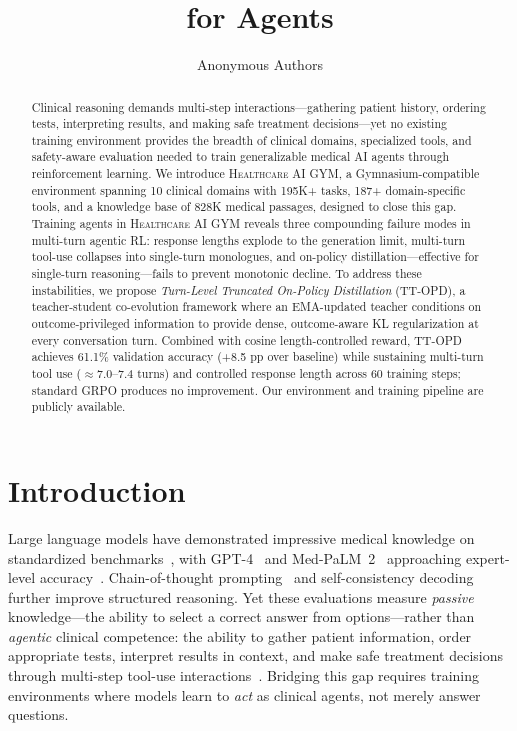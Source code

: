 \documentclass{article}
\title{\gym{} for Agents}
\author{%
  Anonymous Authors \\
}
\newcommand{\gym}{\textsc{Healthcare AI GYM}}
\begin{document}
\maketitle

\begin{abstract}
Clinical reasoning demands multi-step interactions---gathering patient history, ordering tests, interpreting results, and making safe treatment decisions---yet no existing training environment provides the breadth of clinical domains, specialized tools, and safety-aware evaluation needed to train generalizable medical AI agents through reinforcement learning. We introduce \gym{}, a Gymnasium-compatible environment spanning 10 clinical domains with 195K+ tasks, 187+ domain-specific tools, and a knowledge base of 828K medical passages, designed to close this gap. Training agents in \gym{} reveals three compounding failure modes in multi-turn agentic RL: response lengths explode to the generation limit, multi-turn tool-use collapses into single-turn monologues, and on-policy distillation---effective for single-turn reasoning---fails to prevent monotonic decline. To address these instabilities, we propose \emph{Turn-Level Truncated On-Policy Distillation} (TT-OPD), a teacher-student co-evolution framework where an EMA-updated teacher conditions on outcome-privileged information to provide dense, outcome-aware KL regularization at every conversation turn. Combined with cosine length-controlled reward, TT-OPD achieves 61.1\% validation accuracy (+8.5 pp over baseline) while sustaining multi-turn tool use ($\approx$7.0--7.4 turns) and controlled response length across 60 training steps; standard GRPO produces no improvement. Our environment and training pipeline are publicly available.
\end{abstract}

\section{Introduction}
\label{sec:intro}

Large language models have demonstrated impressive medical knowledge on standardized benchmarks~\citep{jin2021medqa, hendrycks2021mmlu, jin2019pubmedqa, pal2022medmcqa}, with GPT-4~\citep{nori2023gpt4} and Med-PaLM~2~\citep{singhal2023medpalm2} approaching expert-level accuracy~\citep{thirunavukarasu2023medicalai}. Chain-of-thought prompting~\citep{wei2022cot} and self-consistency decoding~\citep{wang2023selfconsistency} further improve structured reasoning. Yet these evaluations measure \emph{passive} knowledge---the ability to select a correct answer from options---rather than \emph{agentic} clinical competence: the ability to gather patient information, order appropriate tests, interpret results in context, and make safe treatment decisions through multi-step tool-use interactions~\citep{yao2023react}. Bridging this gap requires training environments where models learn to \emph{act} as clinical agents, not merely answer questions.
\end{document}
